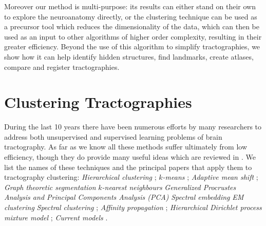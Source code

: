 \documentclass[preprint,authoryear,a4paper,10pt,onecolumn]{elsarticle}
\begin{document}
Moreover our method is multi-purpose: its results can either stand on
their own to explore the neuroanatomy directly, or the clustering
technique can be used as a precursor tool which reduces the
dimensionality of the data, which can then be used as an input to other
algorithms of higher order complexity, resulting in their greater
efficiency. Beyond the use of this algorithm to simplify tractographies,
we show how it can help identify hidden structures, find landmarks,
create atlases, compare and register tractographies.

\section{Clustering Tractographies}

During the last 10 years there have been numerous efforts by many
researchers to address both unsupervised and supervised learning
problems of brain tractography. As far as we know all these methods
suffer ultimately from low efficiency, though they do provide many
useful ideas which are reviewed in \citet{Garyfallidis_thesis}.  We list
the names of these techniques and the principal papers that apply them
to tractography clustering: \textit{Hierarchical clustering}
\citep{Visser2010, gerig2004analysis, Guevara2010, zhang2005dti,
  jianu2009exploring}; \textit{$k$-means} \citep{ElKouby2005, Tsai2007};
\textit{Adaptive mean shift} \citep{zvitia2008adaptive, Zvitia2010};
\textit{Graph theoretic segmentation} \citep{brun2004clustering}
\textit{$k$-nearest neighbours} \citep{Ding2003a} \textit{Generalized
  Procrustes Analysis and Principal Components Analysis (PCA)}
\citep{Corouge2004, corouge2004towards, Corouge2006}
\textit{Spectral embedding} \citep{ODonnell_IEEETMI07}
\textit{EM clustering} \citep{Maddah_MICCA2005, maddah2006statistical,
Maddah_IEEEBI2008, ziyan2009consistency} 
\textit{Spectral clustering} \citep{jonasson2005fiber};
\textit{Affinity propagation} \citep{leemans17new, malcolm2009filtered};
\textit{Hierarchical Dirichlet process mixture model} \citep{wang2010tractography};
\textit{Current models} \citep{Durrleman2009, durrleman2010registration}.



\end{document}
